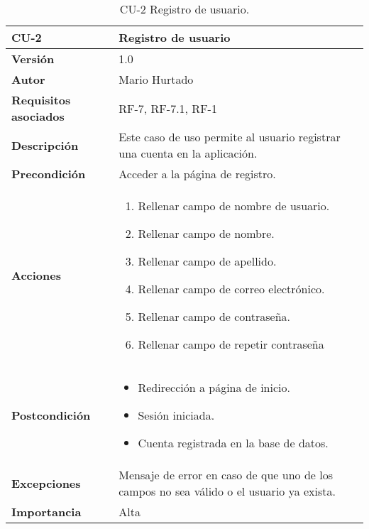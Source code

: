 %
%
\begin{table}[p]
	\centering
	\begin{tabularx}{\linewidth}{ p{} p{} }
			\toprule
			\textbf{CU-2}    & \textbf{Registro de usuario}\\
			\toprule
			\textbf{Versión}              & 1.0    \\
			\textbf{Autor}                & Mario Hurtado \\
			\textbf{Requisitos asociados} & RF-7, RF-7.1, RF-1 \\
			\textbf{Descripción}          & Este caso de uso permite al usuario registrar una cuenta en la aplicación. \\
			\textbf{Precondición}         & Acceder a la página de registro.\\
			\textbf{Acciones}             &
			\begin{enumerate}
					\def\labelenumi{\arabic{enumi}.}
					\tightlist
					\item Rellenar campo de nombre de usuario.
					\item Rellenar campo de nombre.
					\item Rellenar campo de apellido.
					\item Rellenar campo de correo electrónico.
					\item Rellenar campo de contraseña.
					\item Rellenar campo de repetir contraseña
				\end{enumerate}\\
			\textbf{Postcondición}        & \begin{itemize}
				\item Redirección a página de inicio.
				\item Sesión iniciada.
				\item Cuenta registrada en la base de datos.
			\end{itemize} \\
			\textbf{Excepciones}          & Mensaje de error en caso de que uno de los campos no sea válido o el usuario ya exista. \\
			\textbf{Importancia}          & Alta\\
			\bottomrule
		\end{tabularx}
	\caption{CU-2 Registro de usuario.}
\end{table}
%
